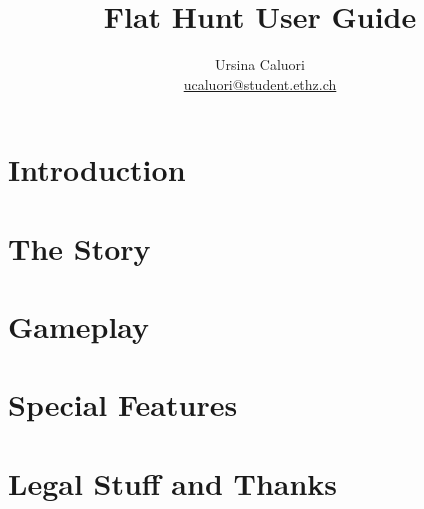 \documentclass[a4paper,titlepage,12pt]{article}
\title{\textbf{Flat Hunt User Guide}}
\author{Ursina Caluori\\ \href{mailto: ucaluori@student.ethz.ch}{ucaluori@student.ethz.ch}}
\begin{document}
  \maketitle
  
  \tableofcontents
  
  \pagebreak

  
 

  \section{Introduction}
    
  \section{The Story}
    
  \section{Gameplay}
     
  \section{Special Features}
    
  \section{Legal Stuff and Thanks}
    
    \hyperref[ugref]{}    
    
    
\end{document}
